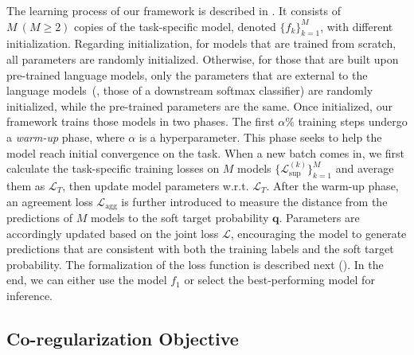 \documentclass[11pt]{article}
\begin{document}
The learning process of our framework is described in .
It consists of $M~(M\ge 2)$ copies of the task-specific model, denoted $\{f_k\}_{k=1}^M$, with different initialization.
Regarding initialization,
for models that are trained from scratch, all parameters are randomly initialized.
Otherwise, for those that are built upon pre-trained language models, only the parameters that are external to the language models~(\eg, those of a downstream softmax classifier) are randomly initialized, while the pre-trained parameters are the same.
Once initialized, our framework trains those models in two phases.
The first $\alpha\%$ training steps undergo a \emph{warm-up} phase, where $\alpha$ is a hyperparameter.
This phase seeks to help the model reach initial convergence on the task.
When a new batch comes in, we first calculate the task-specific training losses on $M$ models $\{\mathcal{L}_\text{sup}^{(k)}\}_{k=1}^M$ and average them as $\mathcal{L}_T$, then update model parameters w.r.t. $\mathcal{L}_T$.
After the warm-up phase, an agreement loss $\mathcal{L}_\text{agg}$ is further introduced to measure the distance from the predictions of $M$ models to the soft target probability $\bm{q}$. 
Parameters are accordingly updated based on the joint loss $\mathcal{L}$, encouraging the model to generate predictions that are consistent with both the training labels and the soft target probability.
The formalization of the loss function is described next ().
In the end, we can either use the model $f_1$ or select the best-performing model for inference.

\subsection{Co-regularization Objective}\label{sec:agreement}
\end{document}
